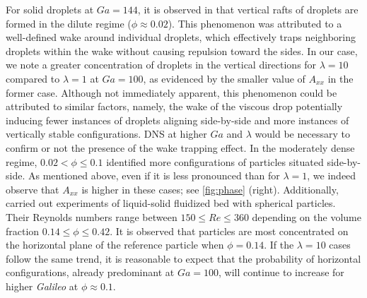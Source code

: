 For solid droplets at $Ga = 144$, it is observed in \citet{shajahan2023inertial} that vertical rafts of droplets are formed in the dilute regime ($\phi \approx 0.02$). This phenomenon was attributed to a well-defined wake around individual droplets, which effectively traps neighboring droplets within the wake without causing repulsion toward the sides. %
In our case, we note a greater concentration of droplets in the vertical directions for $\lambda = 10$ compared to $\lambda = 1$ at $Ga = 100$, as evidenced by the smaller value of $A_{xx}$ in the former case. Although not immediately apparent, this phenomenon could be attributed to similar factors, namely, the wake of the viscous drop potentially inducing fewer instances of droplets aligning side-by-side and more instances of vertically stable configurations. DNS at higher $Ga$ and $\lambda$ would be necessary to confirm or not the presence of the wake trapping effect. %
In the moderately dense regime,  $0.02 < \phi \le 0.1$  \citet{shajahan2023inertial} identified more configurations of particles situated side-by-side. 
As mentioned above, even if it is less pronounced than for $\lambda = 1$, we indeed observe that $A_{xx}$ is higher in these cases; see \ref{fig:phase} (right). 
Additionally, \citet{almeras2021statistics} carried out experiments of liquid-solid fluidized bed with spherical particles. 
Their Reynolds numbers range between $150\leq Re \leq 360$ depending on the volume fraction $0.14 \leq \phi \leq 0.42$.
It is observed that particles are most concentrated on the horizontal plane of the reference particle when $\phi = 0.14$.
If the $\lambda = 10$ cases follow the same trend, it is reasonable to expect that the probability of horizontal configurations, already predominant at $Ga =100$, will continue to increase for higher \textit{Galileo} at $\phi  \approx 0.1$.

